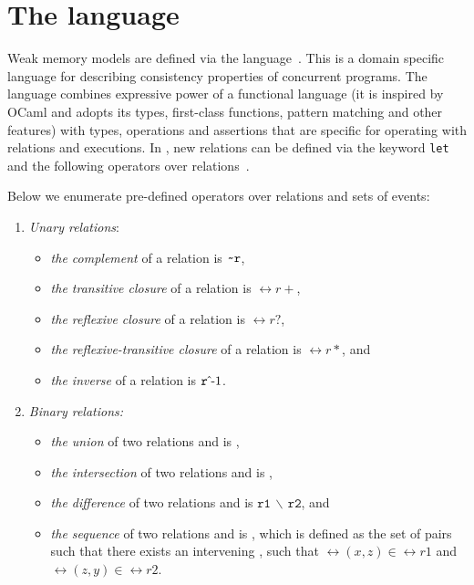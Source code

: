 \section{The \cat{} language}
\label{ch:wmm:cat}

Weak memory models are defined via the \cat{} language~\cite{alglave2016syntax}.
This is a domain specific language for describing consistency properties of concurrent programs.
The \cat{} language combines expressive power of a functional language (it is inspired by OCaml and adopts its types, first-class functions, pattern matching and other features) with types, operations and assertions that are specific for operating with relations and executions.
In \cat{}, new relations can be defined via the keyword \texttt{let} and the following operators over relations~\cite{alglave2016syntax}. %


Below we enumerate pre-defined operators over relations and sets of events:

\begin{enumerate}
  \item \textit{Unary relations}:
    \begin{itemize}
      \item \textit{the complement} of a relation  is $\texttt{\textasciitilde r}$,
      \item \textit{the transitive closure} of a relation  is $\rel{r+}$,
      \item \textit{the reflexive closure} of a relation  is $\rel{r?}$,
      \item \textit{the reflexive-transitive closure} of a relation  is $\rel{r*}$, and
      \item \textit{the inverse} of a relation  is $\invrel{r}$.
    \end{itemize}
  \item \textit{Binary relations:}
  \begin{itemize}
    \item \textit{the union} of two relations  and  is ,
    \item \textit{the intersection} of two relations  and  is ,
    \item \textit{the difference} of two relations  and  is $\mathtt{r1\,\backslash\,r2}$, and
    \item \textit{the sequence} of two relations  and  is , which is defined as the set of pairs  such that there exists an intervening , such that $\rel{(x,z)} \in \rel{r1}$ and $\rel{(z,y)} \in \rel{r2}$.
  \end{itemize}
\end{enumerate}


